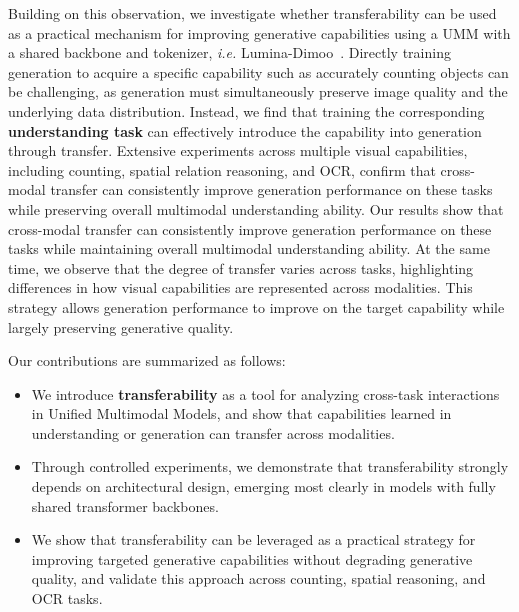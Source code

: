 Building on this observation, we investigate whether transferability can be used as a practical mechanism for improving generative capabilities using a UMM with a shared backbone and tokenizer, \textit{i.e.} Lumina-Dimoo~\cite{xin2025lumina}. Directly training generation to acquire a specific capability such as accurately counting objects can be challenging, as generation must simultaneously preserve image quality and the underlying data distribution. Instead, we find that training the corresponding \textbf{understanding task} can effectively introduce the capability into generation through transfer. Extensive experiments across multiple visual capabilities, including counting, spatial relation reasoning, and OCR, confirm that cross-modal transfer can consistently improve generation performance on these tasks while preserving
overall multimodal understanding ability. Our results show that cross-modal transfer can consistently improve generation performance on these tasks while maintaining overall multimodal understanding ability. At the same time, we observe that the degree of transfer varies across tasks, highlighting differences in how visual capabilities are represented across modalities.
This strategy allows generation performance to improve on the target capability while largely preserving generative quality. 

Our contributions are summarized as follows:
\begin{itemize}
    \item We introduce \textbf{transferability} as a tool for analyzing cross-task interactions in Unified Multimodal Models, and show that capabilities learned in understanding or generation can transfer across modalities.
    \item Through controlled experiments, we demonstrate that transferability strongly depends on architectural design, emerging most clearly in models with fully shared transformer backbones.
    \item We show that transferability can be leveraged as a practical strategy for improving targeted generative capabilities without degrading generative quality, and validate this approach across counting, spatial reasoning, and OCR tasks.
\end{itemize}

